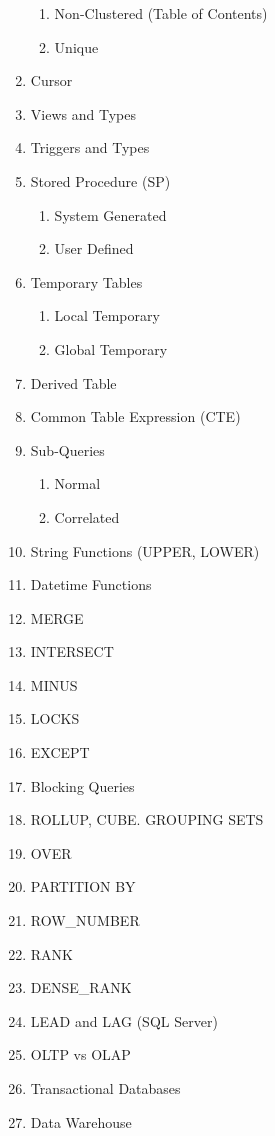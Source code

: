\documentclass[11pt]{article}
\begin{document}
\begin{enumerate}
\begin{enumerate}
	\item Non-Clustered (Table of Contents)
	\item Unique
\end{enumerate}
\item Cursor
\item Views and Types 
\item Triggers and Types
\item Stored Procedure (SP)
\begin{enumerate}
	\item System Generated
	\item User Defined
\end{enumerate}
\item Temporary Tables
\begin{enumerate}
	\item Local Temporary
	\item Global Temporary
\end{enumerate}
\item Derived Table
\item Common Table Expression (CTE)
\item Sub-Queries
\begin{enumerate}
	\item Normal
	\item Correlated
\end{enumerate}
\item String Functions (UPPER, LOWER)
\item Datetime Functions
\item MERGE
 \item INTERSECT
\item MINUS
\item LOCKS
\item EXCEPT
\item Blocking Queries
\item ROLLUP, CUBE. GROUPING SETS
\item OVER
\item PARTITION BY
\item ROW\_NUMBER
\item RANK
\item DENSE\_RANK
\item LEAD and LAG (SQL Server)
\item OLTP vs OLAP
\item Transactional Databases
\item Data Warehouse
\end{enumerate}
\end{document}
